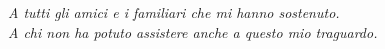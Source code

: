 \clearemptydoublepage{}
\thispagestyle{plain}
\null{}
\begin{flushright}
  \textit{%
    A tutti gli amici e i familiari che mi hanno sostenuto.\\
    A chi non ha potuto assistere anche a questo mio traguardo.
  }
\end{flushright}
\null{}
